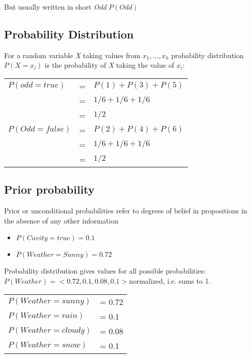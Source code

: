 But usually written in short \textit{Odd} $P(Odd)$

\subsection{Probability Distribution}
For a random variable \textit{X} taking values from $x_1, \dots, x_k$ probability distribution $P(X = x_i)$ is the probability of \textit{X} taking the value of $x_i$:\\

\begin{table}[h]
\centering
\begin{tabular}{l l l}
$P(odd = true)$ & = & $P(1) + P(3) + P(5)$ \\
 & = & $1/6 + 1/6 + 1/6$ \\
 & = & $1/2$ \\
 $P(Odd = false)$ & = & $P(2) + P(4) + P(6)$ \\
 & = & $1/6 + 1/6 + 1/6$\\
 & = & $1/2$
\end{tabular}
\end{table}

\subsection{Prior probability}
Prior or unconditional probabilities refer to degrees of belief in propositions in the absence of any other information\\

\begin{itemize}
\item $P(Cavity = true) = 0.1$
\item $P(Weather = Sunny) = 0.72$
\end{itemize}

Probability distribution gives values for all possible probabilities:\\
$P(Weather) = <0.72, 0.1, 0.08, 0.1> $normalized, i.e. sums to 1.\\

\begin{table}[h]
\centering
\begin{tabular}{l l}
$P(Weather = sunny)$ & = 0.72\\
$P(Weather = rain)$ & = 0.1\\
$P(Weather = cloudy)$ & = 0.08\\
$P(Weather = snow)$ & = 0.1
\end{tabular}
\end{table}

